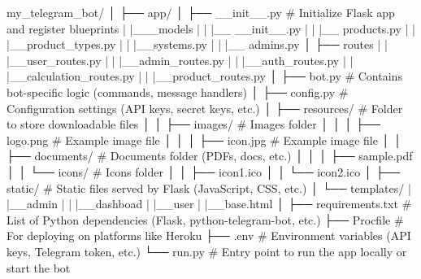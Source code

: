 my_telegram_bot/
│
├── app/
│   ├── __init__.py          # Initialize Flask app and register blueprints
|   |___models
|   |   |__ __init__.py
|   |   |__ products.py
|   |   |__product_types.py
|   |   |__systems.py
|   |   |__ admins.py
│   ├── routes
|   |   |__user_routes.py
|   |   |__admin_routes.py
|   |   |__auth_routes.py
|   |   |__calculation_routes.py
|   |   |__product_routes.py
│   ├── bot.py              # Contains bot-specific logic (commands, message handlers)
│   ├── config.py           # Configuration settings (API keys, secret keys, etc.)
│   ├── resources/          # Folder to store downloadable files
│   │   ├── images/         # Images folder
│   │   │   ├── logo.png    # Example image file
│   │   │   ├── icon.jpg    # Example image file
│   │   ├── documents/      # Documents folder (PDFs, docs, etc.)
│   │   │   ├── sample.pdf
│   │   └── icons/          # Icons folder
│   │       ├── icon1.ico
│   │       └── icon2.ico
│   ├── static/             # Static files served by Flask (JavaScript, CSS, etc.)
│   └── templates/
|       |__admin
|       |  |__dashboad
|       |__user
|       |__base.html          
│
├── requirements.txt        # List of Python dependencies (Flask, python-telegram-bot, etc.)
├── Procfile                # For deploying on platforms like Heroku
├── .env                    # Environment variables (API keys, Telegram token, etc.)
└── run.py                  # Entry point to run the app locally or start the bot
